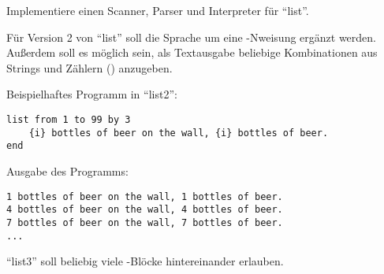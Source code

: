 \documentclass[fontsize=10pt, a4paper, ngerman]{scrartcl}
\begin{document}
\begin{aufgabe}[subtitle=list 1.0]
\begin{itemize}
			\begin{center}
			\end{center}
	\end{itemize}

	Implementiere einen Scanner, Parser und Interpreter für \enquote{list}.

\end{aufgabe}

\begin{aufgabe}[subtitle=list 2.0]
	\label{aufg:list-v2}
	Für Version 2 von \enquote{list} soll die Sprache um eine -Nweisung ergänzt werden. Außerdem
	soll es möglich sein, als Textausgabe beliebige Kombinationen aus Strings und Zählern
	() anzugeben.

	\begin{minipage}[t]{.6\textwidth}
		Beispielhaftes Programm in \enquote{list2}:
		\begin{verbatim}
list from 1 to 99 by 3
    {i} bottles of beer on the wall, {i} bottles of beer.
end
		\end{verbatim}
		\end{minipage}\hfill\begin{minipage}[t]{.4\textwidth}
		Ausgabe des Programms:
		\begin{verbatim}
1 bottles of beer on the wall, 1 bottles of beer.
4 bottles of beer on the wall, 4 bottles of beer.
7 bottles of beer on the wall, 7 bottles of beer.
...
		\end{verbatim}
	\end{minipage}
\end{aufgabe}

\begin{aufgabe}[subtitle=list 3.0]
	\label{aufg:list-v3}
	\enquote{list3} soll beliebig viele -Blöcke hintereinander erlauben.
\end{aufgabe}
\end{document}
